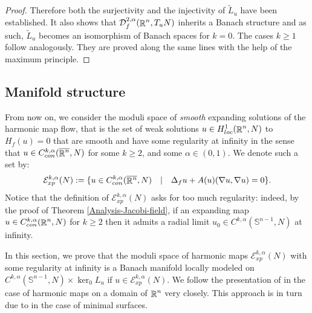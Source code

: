 \documentclass[a4paper,11pt,reqno]{amsart}
\def\R{\mathop{\rm \mathbb{R}}\nolimits}
\newcommand{\Sp}{\mathbb{S}}
\newcommand{\Ent}{\mathcal{E}}
\begin{document}
\begin{proof}
Therefore both the surjectivity and the injectivity of $\tilde{L}_u$ have been established. It also shows that $\mathcal{D}_f^{2,\alpha}(\R^n,T_uN)$ inherits a Banach structure and as such, $\tilde{L}_u$ becomes an isomorphism of Banach spaces for $k=0$. The cases $k\geq 1$ follow analogously. 
They are proved along the same lines with the help of the maximum principle.
\end{proof}
\subsection{Manifold structure}
From now on, we consider the moduli space of \textit{smooth} expanding solutions of the harmonic map flow, that is the set of weak solutions $u\in H^1_{loc}(\R^n,N)$ to $H_f(u)=0$ that are smooth and have some regularity at infinity in the sense that $u\in C_{con}^{k,\alpha}(\overline{\R^n},N)$ for some $k\geq 2$, and some $\alpha\in(0,1)$. We denote such a set by:
\begin{eqnarray*}
\Ent_{xp}^{k,\alpha}(N):=\{u\in  C_{con}^{k,\alpha}(\overline{\R^n},N)\quad|\quad \Delta_fu+A(u)(\nabla u,\nabla u)=0\}. 
\end{eqnarray*}
Notice that the definition of $\Ent_{xp}^{k,\alpha}(N)$ asks for too much regularity: indeed, by the proof of Theorem \ref{Analysis-Jacobi-field}, if an expanding map $u\in  C_{con}^{k,\alpha}(\R^n,N)$ for $k\geq 2$ then it admits a radial limit $u_0\in C^{k,\alpha}(\Sp^{n-1},N)$ at infinity.



In this section, we prove that the moduli space of harmonic maps $\mathcal{E}_{xp}^{k,\alpha}(N)$ with some regularity at infinity is a Banach manifold locally modeled on $C^{k,\alpha}(\mathbb{S}^{n-1},N)\times \ker_0L_u$ if $u\in \mathcal{E}_{xp}^{k,\alpha}(N)$. We follow the presentation of \cite{Har-Mou} in the case of harmonic maps on a domain of $\R^n$ very closely. This approach is in turn due to \cite{White-var-met} in the case of minimal surfaces.
\end{document}
